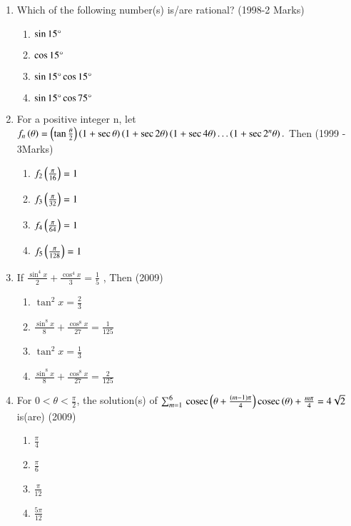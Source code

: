 \documentclass[journal,12pt,twocolumn]{IEEEtran}
\theoremstyle{remark}
\begin{document}
\begin{enumerate}
\item Which of the following number(s) is/are rational? \hfill(1998-2 Marks) 
\begin{enumerate}
    \item $\sin{15}\degree$
    \item $\cos{15}\degree$
    \item $\sin{15}\degree \cos{15}\degree$
    \item $\sin{15}\degree \cos{75}\degree$
\end{enumerate}
\item For a positive integer n, let \ 
$f_n\left(\theta\right) = \left(\tan\frac{\theta}{2}\right)\left(1+\sec{\theta}\right)\left(1+\sec{2\theta}\right)\left(1+\sec4\theta\right)\dots\left(1+\sec2^n{\theta}\right).$ Then \hfill(1999 - 3Marks)
\begin{enumerate}
    \item $f_2\left(\frac{\pi}{16}\right) = 1$
    \item $f_3\left(\frac{\pi}{32}\right) = 1$
    \item $f_4\left(\frac{\pi}{64}\right) = 1$
    \item $f_5\left(\frac{\pi}{128}\right) = 1$
\end{enumerate}
\item If $\frac{\sin^4{x}}{2}+\frac{\cos^4{x}}{3}=\frac{1}{5}$ , Then \hfill(2009) 
\begin{enumerate}
    \item $\tan^2{x}=\frac{2}{3}$
    \item $\frac{\sin^8{x}}{8}+\frac{\cos^8{x}}{27}=\frac{1}{125}$
    \item $\tan^2{x}=\frac{1}{3}$
    \item $\frac{\sin^8{x}}{8}+\frac{\cos^8{x}}{27}=\frac{2}{125}$
\end{enumerate}
\item For $ 0<\theta <\frac{\pi}{2}$, the solution(s) of $\sum_{m=1}^{6}\,\text{cosec}\,{\left(\theta+\frac{(m-1)\pi}{4}\right)}\,\text{cosec}\,{{\left(\theta\right)+\frac{m\pi}{4}} }= 4\sqrt{2}$ is(are) \hfill(2009) 
\begin{enumerate}
    \item $\frac{\pi}{4}$
    \item $\frac{\pi}{6}$
    \item $\frac{\pi}{12}$
    \item $\frac{5\pi}{12}$
\end{enumerate}


\end{enumerate}
\end{document}
